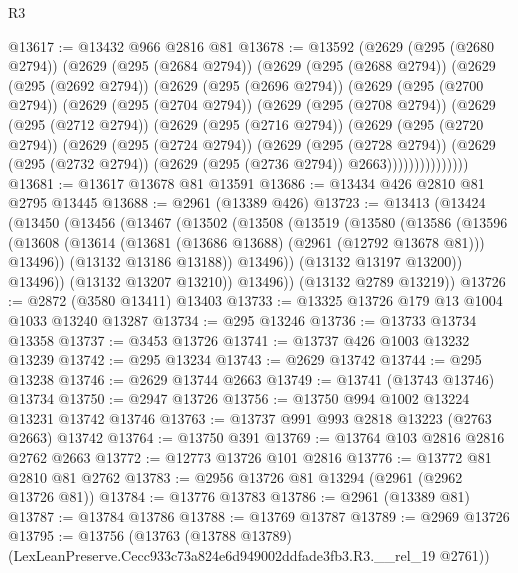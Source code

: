 \begin{lexlean}{R3}
\begin{coremodule}
@13617 := @13432 @966 @2816 @81
@13678 := @13592
    (@2629
      (@295 (@2680 @2794))
      (@2629
        (@295 (@2684 @2794))
        (@2629
          (@295 (@2688 @2794))
          (@2629
            (@295 (@2692 @2794))
            (@2629
              (@295 (@2696 @2794))
              (@2629
                (@295 (@2700 @2794))
                (@2629
                  (@295 (@2704 @2794))
                  (@2629
                    (@295 (@2708 @2794))
                    (@2629
                      (@295 (@2712 @2794))
                      (@2629
                        (@295 (@2716 @2794))
                        (@2629
                          (@295 (@2720 @2794))
                          (@2629
                            (@295 (@2724 @2794))
                            (@2629
                              (@295 (@2728 @2794))
                              (@2629
                                (@295 (@2732 @2794))
                                (@2629 (@295 (@2736 @2794)) @2663)))))))))))))))
@13681 := @13617 @13678 @81 @13591
@13686 := @13434 @426 @2810 @81 @2795 @13445
@13688 := @2961 (@13389 @426)
@13723 := @13413
    (@13424
      (@13450
        (@13456
          (@13467
            (@13502
              (@13508
                (@13519
                  (@13580
                    (@13586
                      (@13596
                        (@13608
                          (@13614 (@13681 (@13686 @13688) (@2961 (@12792 @13678 @81))) @13496))
                        (@13132 @13186 @13188))
                      @13496))
                  (@13132 @13197 @13200))
                @13496))
            (@13132 @13207 @13210))
          @13496))
      (@13132 @2789 @13219))
@13726 := @2872 (@3580 @13411) @13403
@13733 := @13325 @13726 @179 @13 @1004 @1033 @13240 @13287
@13734 := @295 @13246
@13736 := @13733 @13734 @13358
@13737 := @3453 @13726
@13741 := @13737 @426 @1003 @13232 @13239
@13742 := @295 @13234
@13743 := @2629 @13742
@13744 := @295 @13238
@13746 := @2629 @13744 @2663
@13749 := @13741 (@13743 @13746) @13734
@13750 := @2947 @13726
@13756 := @13750 @994 @1002 @13224 @13231 @13742 @13746
@13763 := @13737 @991 @993 @2818 @13223 (@2763 @2663) @13742
@13764 := @13750 @391
@13769 := @13764 @103 @2816 @2816 @2762 @2663
@13772 := @12773 @13726 @101 @2816
@13776 := @13772 @81 @2810 @81 @2762
@13783 := @2956 @13726 @81 @13294 (@2961 (@2962 @13726 @81))
@13784 := @13776 @13783
@13786 := @2961 (@13389 @81)
@13787 := @13784 @13786
@13788 := @13769 @13787
@13789 := @2969 @13726
@13795 := @13756
    (@13763 (@13788 @13789) (LexLeanPreserve.Cecc933c73a824e6d949002ddfade3fb3.R3.__rel_19 @2761))

\end{coremodule}
\end{lexlean}
